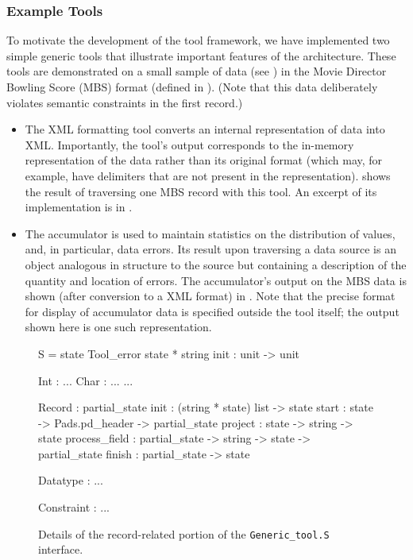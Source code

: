 \subsubsection{Example Tools}
\label{sec:gentool-motivation-ex}
To motivate the development of the tool framework, we have implemented two simple generic tools that illustrate important features of the architecture. These tools are demonstrated on a small sample of data (see ) in the Movie Director Bowling Score (MBS) format (defined in ). (Note that this data deliberately violates semantic constraints in the first record.)
\begin{itemize}
\item The XML formatting tool converts an internal \padsml{} representation of data into XML. Importantly, the tool's output corresponds to the in-memory representation of the data rather than its original format (which may, for example, have delimiters that are not present in the representation).  shows the result of traversing one MBS record with this tool. An excerpt of its implementation is in .
\item The accumulator is used to maintain statistics on the distribution of values, and, in particular, data errors. Its result upon traversing a data source is an object analogous in structure to the source but containing a description of the quantity and location of errors. The accumulator's output on the MBS data is shown (after conversion to a XML format) in . Note that the precise format for display of accumulator data is specified outside the tool itself; the output shown here is one such representation.
\end{itemize}

\begin{figure}
\begin{code}\scriptsize
{}  S = 
   state
   Tool\_error  state * string
   init : unit -> unit

   Int    : ...
   Char   : ...
  ...

   Record : 
     partial_state
     init  : (string * state) list -> state
     start : state -> Pads.pd_header 
    	-> partial_state
     project : state -> string -> state
     process_field  : partial_state -> string
    	-> state -> partial_state
     finish : partial_state -> state

   Datatype : 
    ...

   Constraint : 
    ...
\end{code}
\caption{Details of the record-related portion of the {\tt Generic\_tool.S} interface.}
\label{fig:gentool-interface}
\end{figure}

